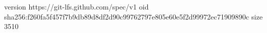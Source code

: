 version https://git-lfs.github.com/spec/v1
oid sha256:f260fa5f457f7b9db89d8df2d90c99762797e805e60e5f2d99972ec71909890c
size 3510
